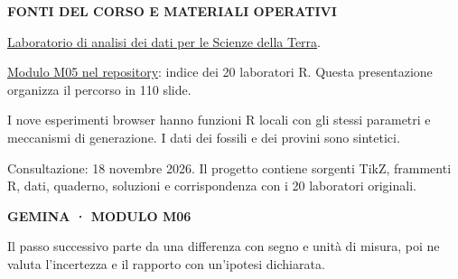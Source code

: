 \documentclass[12pt,aspectratio=1610]{beamer}
\newcommand{\PLabel}[1]{\par{\color{Classical}\bfseries\fontsize{9}{11}\selectfont\MakeUppercase{#1}}\par\vspace{1.8mm}}
\newcommand{\PBody}[1]{\par{\fontsize{11.3}{14.8}\selectfont #1\par}}
\newcommand{\PSmall}[1]{\par{\fontsize{9.8}{13.1}\selectfont #1\par}}
\begin{document}
\begin{lrbox}{\PilotLeftBox}%
\begin{minipage}[t]{10.05cm}\raggedright\color{Ink}\fontsize{11.3}{14.8}\selectfont

\PLabel{Fonti del corso e materiali operativi}
\PBody{\href{https://marzione00.github.io/Lab_Geo/}{Laboratorio di analisi dei dati per le Scienze della Terra}.}
\vspace{3mm}
\PBody{\href{https://github.com/marzione00/Lab_Geo/tree/main/moduli/M05}{Modulo M05 nel repository}: indice dei 20 laboratori R. Questa presentazione organizza il percorso in 110 slide.}
\vspace{3mm}
\PBody{I nove esperimenti browser hanno funzioni R locali con gli stessi parametri e meccanismi di generazione. I dati dei fossili e dei provini sono sintetici.}
\vspace{3mm}
\PSmall{Consultazione: 18 novembre 2026. Il progetto contiene sorgenti TikZ, frammenti R, dati, quaderno, soluzioni e corrispondenza con i 20 laboratori originali.}

\end{minipage}%
\end{lrbox}
\begin{lrbox}{\PilotRightBox}%
\begin{minipage}[t]{7.55cm}\raggedright\color{Ink}\fontsize{11.3}{14.8}\selectfont

\PLabel{Gemina · modulo M06}
\PBody{Il passo successivo parte da una differenza con segno e unità di misura, poi ne valuta l'incertezza e il rapporto con un'ipotesi dichiarata.}

\end{minipage}%
\end{lrbox}
\end{document}
